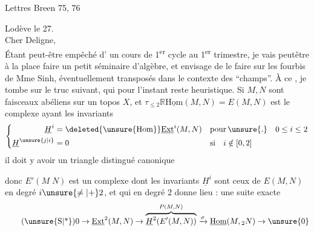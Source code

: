 
Lettres Breen 75, 76



\noindent\hfill Lodève le 27.\\
Cher Deligne,\\
Étant peut-être empêché   d' un cours de 1\textsuperscript{er} cycle au 1\textsuperscript{er} trimestre, je vais peutêtre à la place faire un petit séminaire d'algèbre, et envisage de le faire sur les fourbis de Mme Sinh, éventuellement transposés dans le contexte des ``champs''. À ce , je tombe sur le truc suivant, qui pour l'instant reste heuristique. Si $M,N$ sont  faisceaux abéliens sur un topos $X$, et $\tau_{\leq 2}\mathbb{R}\underline{\mathrm{Hom}}(M,N)=E(M,N)$ est le complexe ayant les invariants
\[
\left\{\begin{aligned}
\underline{H}^{i} &= \deleted{\unsure{\mathrm{Hom}}}\underline{\mathrm{Ext}}^{i}(M,N) && \text{pour}\,\unsure{.}\quad 0\leq i\leq 2\\
\underline{H}^{\unsure{j|i}} &= 0 && \text{si}\quad i\notin[0,2]
\end{aligned}\right.
\]
il doit y avoir un triangle distingué canonique


\margin{\mbox{-- --}}

donc $E'(M\;N)$ est un complexe dont les invariants $\underline{H}^{i}$ sont ceux de $E(M,N)$ en degré $i\unsure{\ne|+}2$, et qui en degré $2$ donne lieu : une suite exacte
\begingroup
\makeatletter\tagsleft@true\makeatother
\[
\tag*{(\unsure{S|*})}
0\to\underline{\mathrm{Ext}}^{2}(M,N)\to
\overbrace{\underline{H}^{2}\!\left(E'(M,N)\right)}^{P(M,N)}
\xrightarrow{\sigma}\underline{\mathrm{Hom}}(M,{}_{2}N)\to \unsure{0}
\]
\endgroup


